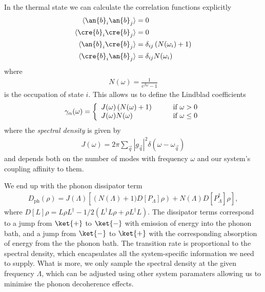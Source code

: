 In the thermal state we can calculate the correlation functions explicitly
\begin{align}
  \langle \an{b}_i \an{b}_j \rangle &= 0 \\
  \langle \cre{b}_i \cre{b}_j \rangle &= 0 \\
  \langle \an{b}_i \cre{b}_j \rangle &= \delta_{ij} \left( N(\omega_i) +1 \right) \\
  \langle \cre{b}_i \an{b}_j \rangle &= \delta_{ij} N(\omega_i)
\end{align}
where
\begin{align}
  N(\omega) = \frac{1}{e^{\beta \omega} - 1}
\end{align}
is the occupation of state $i$. This allows us to define the Lindblad coefficients
\begin{align}
  \gamma_\alpha(\omega) = \left\{
    \begin{array}{l l}
    J(\omega)\left(N(\omega) + 1\right) & \qquad \text{if $\omega > 0$}\\
    J(\omega)N(\omega) & \qquad \text{if $\omega \leq 0$}
  \end{array} \right.
\end{align}
where the \textit{spectral density} is given by
\begin{align}
  J(\omega) = 2\pi \sum_\vec{q} |g_\vec{q}|^2 \delta(\omega-\omega_\vec{q})
\end{align}
and depends both on the number of modes with frequency $\omega$ and our system's coupling affinity to them.

We end up with the phonon dissipator term
\begin{align}
  D_\text{ph}(\rho) = J(\Lambda)\left[\left(N(\Lambda) + 1)D[P_\Lambda]\rho\right) + N(\Lambda)D[P^\dagger_\Lambda]\rho \right],
\end{align}
where $D[L]\rho = L\rho L^\dagger -1/2(L^\dagger L\rho + \rho L^\dagger L)$. The dissipator terms correspond to a jump from $\ket{+}$ to $\ket{-}$ with emission of energy into the phonon bath, and a jump from $\ket{-}$ to $\ket{+}$ with the corresponding absorption of energy from the the phonon bath. The transition rate is proportional to the spectral density, which encapsulates all the system-specific information we need to supply. What is more, we only sample the spectral density at the given frequency $\Lambda$, which can be adjusted using other system paramaters allowing us to minimise the phonon decoherence effects.
